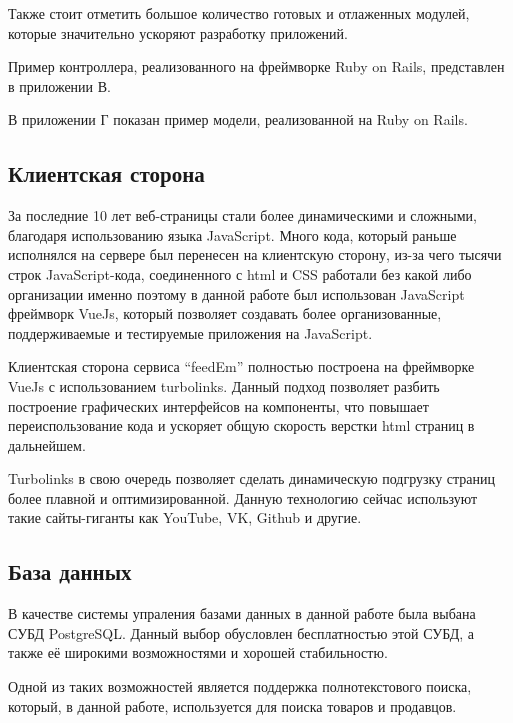 {  Также стоит отметить большое количество готовых и отлаженных модулей, которые значительно ускоряют разработку приложений.

  Пример контроллера, реализованного на фреймворке Ruby on Rails, представлен в приложении В.

  В приложении Г показан пример модели, реализованной на Ruby on Rails.

  \subsection{Клиентская сторона}

  За последние 10 лет веб-страницы стали более динамическими и сложными, благодаря
  использованию языка JavaScript. Много кода, который раньше исполнялся на сервере
  был перенесен на клиентскую сторону, из-за чего тысячи строк JavaScript-кода,
  соединенного с html и CSS работали без какой либо организации именно поэтому в данной работе
  был использован JavaScript фреймворк VueJs, который позволяет создавать более
  организованные, поддерживаемые и тестируемые приложения на JavaScript.

  Клиентская сторона сервиса \enquote{feedEm} полностью построена на фреймворке VueJs
  с использованием turbolinks. Данный подход позволяет разбить построение
  графических интерфейсов на компоненты,
  что повышает переиспользование кода
  и ускоряет общую скорость верстки html страниц в дальнейшем.

  Turbolinks в свою очередь позволяет сделать динамическую подгрузку страниц
  более плавной и оптимизированной.
  Данную технологию сейчас используют такие сайты-гиганты как YouTube, VK,
  Github и другие.

  \subsection{База данных}

  В качестве системы упраления базами данных в данной работе была выбана СУБД PostgreSQL. Данный выбор обусловлен бесплатностью этой СУБД, а также её широкими возможностями и хорошей стабильностю.

  Одной из таких возможностей является поддержка полнотекстового поиска, который, в данной работе, используется для поиска товаров и продавцов.
}

